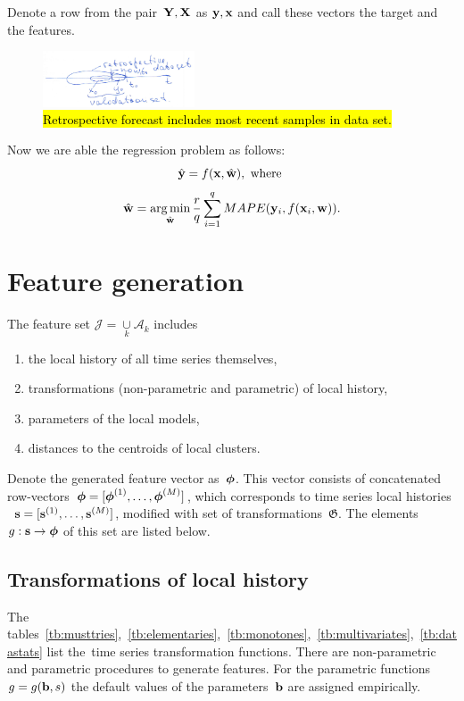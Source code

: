 \documentclass[conference]{IEEEtran}
\begin{document}
Denote a row from the pair~$\mathbf{Y},{\mathbf{X}}$ as ${\mathbf{y}},{\mathbf{x}}$ and call these vectors the target and the features.

\begin{figure}[!ht]
\centering\includegraphics[width=0.4\textwidth]{retrospective_validation.png}
\caption{\hl{Retrospective forecast includes most recent samples in data set.}\label{fg:retrospective}}
\end{figure}

Now we are able the regression problem as follows:
\begin{equation}\label{eq:regression_problem}
\hat{\y} = f(\x, \hat{\w}), \text{~where~}
\end{equation}
\[ \hat{{\mathbf{w}}} = \mathop{\arg\min}_{\hat{{\mathbf{w}}}}\frac{r}{q}\sum_{i=1}^{q} MAPE({\mathbf{y}}_i, f({\mathbf{x}}_i, {\mathbf{w}})).\]

\section{Feature generation}
The feature set $\mathcal{J} = \mathop{\cup}\limits_k \mathcal{A}_k$ includes
\begin{enumerate}[1)]
\item the local history of all time series themselves,
\item transformations (non-parametric and parametric) of local history,
\item parameters of the local models,
\item distances to the centroids of local clusters.
\end{enumerate}


Denote the generated feature vector as~${\boldsymbol{\phi}}$. This vector consists of concatenated row-vectors~${\boldsymbol{\phi}}=[{\boldsymbol{\phi}}^{(1)},\dots,{\boldsymbol{\phi}}^{(M)}]$, which corresponds to time series local histories ~${\mathbf{s}}=[{\mathbf{s}}^{(1)},\dots,{\mathbf{s}}^{(M)}]$, modified with set of transformations~$\mathfrak{G}$. The elements~$g:{\mathbf{s}}\to{\boldsymbol{\phi}}$ of this set are listed below.

\subsection{Transformations of local history}
The tables~\ref{tb:musttries},~\ref{tb:elementaries},~\ref{tb:monotones},~\ref{tb:multivariates},~\ref{tb:datastats} list the~time series transformation functions. There are non-parametric and parametric procedures to generate features. For the parametric functions~$g=g({\mathbf{b}},s)$ the default values of the parameters~${\mathbf{b}}$ are assigned empirically.
\end{document}
